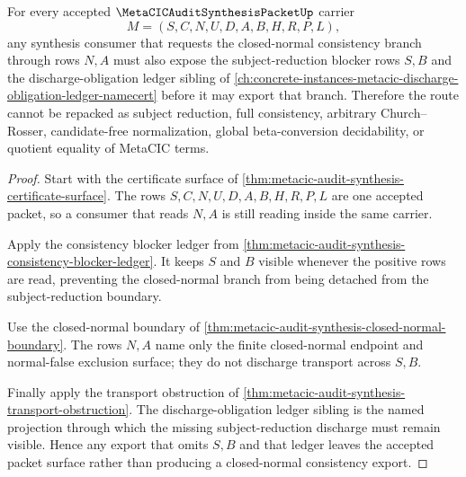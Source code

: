 \begin{theorem}
\label{thm:metacic-audit-synthesis-discharge-projection}
For every accepted $\MetaCICAuditSynthesisPacketUp$ carrier
$$
M=(S,C,N,U,D,A,B,H,R,P,L),
$$
any synthesis consumer that requests the closed-normal consistency branch through rows $N,A$ must also expose the subject-reduction blocker rows $S,B$ and the discharge-obligation ledger sibling of \autoref{ch:concrete-instances-metacic-discharge-obligation-ledger-namecert} before it may export that branch. Therefore the route cannot be repacked as subject reduction, full consistency, arbitrary Church--Rosser, candidate-free normalization, global beta-conversion decidability, or quotient equality of MetaCIC terms.
\end{theorem}
\begin{proof}
Start with the certificate surface of \autoref{thm:metacic-audit-synthesis-certificate-surface}. The rows $S,C,N,U,D,A,B,H,R,P,L$ are one accepted packet, so a consumer that reads $N,A$ is still reading inside the same carrier.

Apply the consistency blocker ledger from \autoref{thm:metacic-audit-synthesis-consistency-blocker-ledger}. It keeps $S$ and $B$ visible whenever the positive rows are read, preventing the closed-normal branch from being detached from the subject-reduction boundary.

Use the closed-normal boundary of \autoref{thm:metacic-audit-synthesis-closed-normal-boundary}. The rows $N,A$ name only the finite closed-normal endpoint and normal-false exclusion surface; they do not discharge transport across $S,B$.

Finally apply the transport obstruction of \autoref{thm:metacic-audit-synthesis-transport-obstruction}. The discharge-obligation ledger sibling is the named projection through which the missing subject-reduction discharge must remain visible. Hence any export that omits $S,B$ and that ledger leaves the accepted packet surface rather than producing a closed-normal consistency export.
\end{proof}

